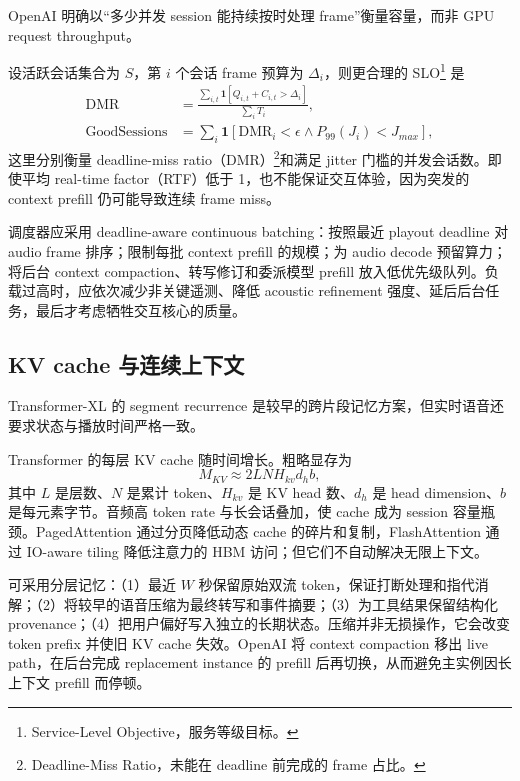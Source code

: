 \FOne OpenAI 明确以“多少并发 session 能持续按时处理 frame”衡量容量，而非 GPU request throughput\cite{openai2026continuous}。

设活跃会话集合为 $S$，第 $i$ 个会话 frame 预算为 $\Delta_i$，则更合理的 SLO\footnote{Service-Level Objective，服务等级目标。} 是
\begin{align}
\mathrm{DMR} &= \frac{\sum_{i,t}\mathbf 1[Q_{i,t}+C_{i,t}>\Delta_i]}{\sum_iT_i},\\
\mathrm{GoodSessions} &= \sum_i\mathbf 1[\mathrm{DMR}_i<\epsilon\land P_{99}(J_i)<J_{max}],
\end{align}
这里分别衡量 deadline-miss ratio（DMR）\footnote{Deadline-Miss Ratio，未能在 deadline 前完成的 frame 占比。}和满足 jitter 门槛的并发会话数。即使平均 real-time factor（RTF）低于 1，也不能保证交互体验，因为突发的 context prefill 仍可能导致连续 frame miss。

调度器应采用 deadline-aware continuous batching：按照最近 playout deadline 对 audio frame 排序；限制每批 context prefill 的规模；为 audio decode 预留算力；将后台 context compaction、转写修订和委派模型 prefill 放入低优先级队列。负载过高时，应依次减少非关键遥测、降低 acoustic refinement 强度、延后后台任务，最后才考虑牺牲交互核心的质量。

\subsection{KV cache 与连续上下文}

Transformer-XL 的 segment recurrence 是较早的跨片段记忆方案\cite{dai2019transformerxl}，但实时语音还要求状态与播放时间严格一致。

Transformer 的每层 KV cache 随时间增长。粗略显存为
\begin{equation}
M_{KV}\approx 2LNH_{kv}d_hb,
\end{equation}
其中 $L$ 是层数、$N$ 是累计 token、$H_{kv}$ 是 KV head 数、$d_h$ 是 head dimension、$b$ 是每元素字节。音频高 token rate 与长会话叠加，使 cache 成为 session 容量瓶颈。PagedAttention 通过分页降低动态 cache 的碎片和复制，FlashAttention 通过 IO-aware tiling 降低注意力的 HBM 访问\cite{kwon2023pagedattention,dao2022flashattention}；但它们不自动解决无限上下文。

可采用分层记忆：（1）最近 $W$ 秒保留原始双流 token，保证打断处理和指代消解；（2）将较早的语音压缩为最终转写和事件摘要；（3）为工具结果保留结构化 provenance；（4）把用户偏好写入独立的长期状态。压缩并非无损操作，它会改变 token prefix 并使旧 KV cache 失效。\FOne OpenAI 将 context compaction 移出 live path，在后台完成 replacement instance 的 prefill 后再切换\cite{openai2026continuous}，从而避免主实例因长上下文 prefill 而停顿。


